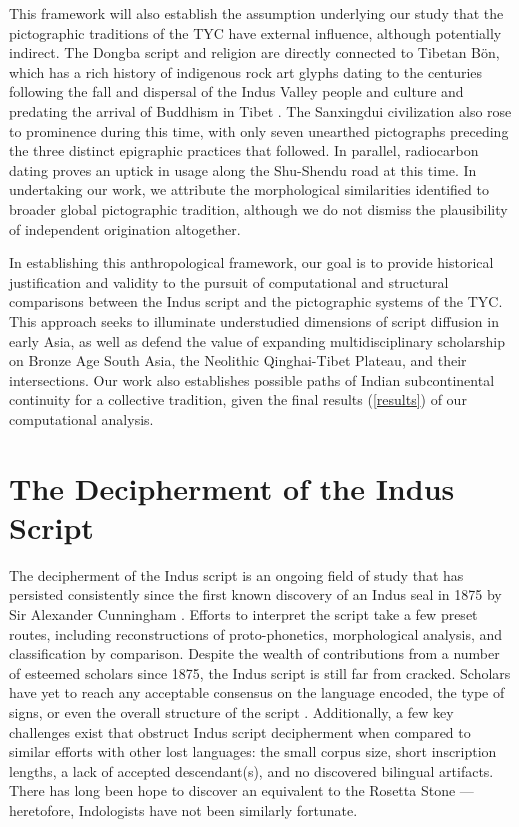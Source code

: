 \documentclass[11pt,a4paper,oneside]{report}
\begin{document}
This framework will also establish the assumption underlying our study that the pictographic traditions of the TYC have external influence, although potentially indirect. The Dongba script and religion are directly connected to Tibetan Bön, which has a rich history of indigenous rock art glyphs dating to the centuries following the fall and dispersal of the Indus Valley people and culture and predating the arrival of Buddhism in Tibet \cite{bellezza_comprehensive_2023}. The Sanxingdui civilization also rose to prominence during this time, with only seven unearthed pictographs preceding the three distinct epigraphic practices that followed. In parallel, radiocarbon dating proves an uptick in usage along the Shu-Shendu road at this time. In undertaking our work, we attribute the morphological similarities identified to broader global pictographic tradition, although we do not dismiss the plausibility of independent origination altogether.

In establishing this anthropological framework, our goal is to provide historical justification and validity to the pursuit of computational and structural comparisons between the Indus script and the pictographic systems of the TYC. This approach seeks to illuminate understudied dimensions of script diffusion in early Asia, as well as defend the value of expanding multidisciplinary scholarship on Bronze Age South Asia, the Neolithic Qinghai-Tibet Plateau, and their intersections. Our work also establishes possible paths of Indian subcontinental continuity for a collective tradition, given the final results (\ref{results}) of our computational analysis.

\section{The Decipherment of the Indus Script}
\noindent\hspace{1cm}
The decipherment of the Indus script is an ongoing field of study that has persisted consistently since the first known discovery of an Indus seal in 1875 by Sir Alexander Cunningham \cite{parpola_special_2005}. Efforts to interpret the script take a few preset routes, including reconstructions of proto-phonetics, morphological analysis, and classification by comparison. Despite the wealth of contributions from a number of esteemed scholars since 1875, the Indus script is still far from cracked. Scholars have yet to reach any acceptable consensus on the language encoded, the type of signs, or even the overall structure of the script \cite{jyothibabu_iravatham_2023}. Additionally, a few key challenges exist that obstruct Indus script decipherment when compared to similar efforts with other lost languages: the small corpus size, short inscription lengths, a lack of accepted descendant(s), and no discovered bilingual artifacts. There has long been hope to discover an equivalent to the Rosetta Stone — heretofore, Indologists have not been similarly fortunate.
\end{document}

